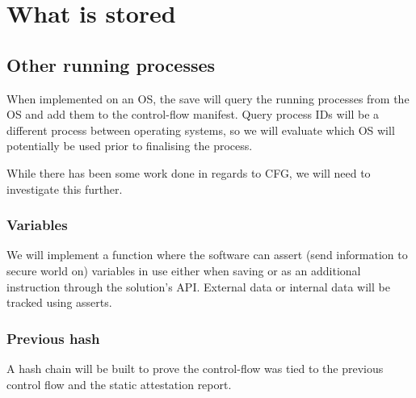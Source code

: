 \section{What is stored}

\subsection{Other running processes}

When implemented on an OS, the save will query the running processes from the OS and add them to the control-flow manifest. Query process IDs will be a different process between operating systems, so we will evaluate which OS will potentially be used prior to finalising the process.

While there has been some work done in regards to CFG, we will need to investigate this further.

\subsubsection{Variables}

We will implement a function where the software can assert (send information to secure world on) variables in use either when saving or as an additional instruction through the solution's API. External data or internal data will be tracked using asserts.

\subsubsection{Previous hash}

A hash chain will be built to prove the control-flow was tied to the previous control flow and the static attestation report.